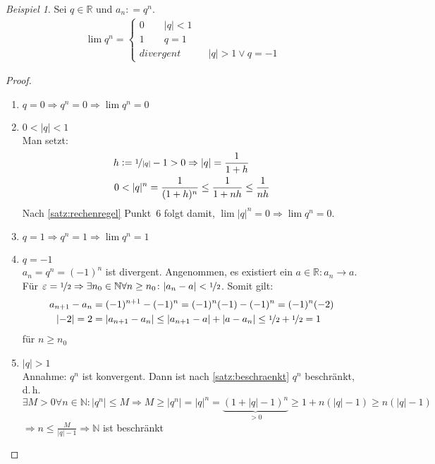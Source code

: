 \documentclass[ngerman,titlepage,twoside, parskip=half*]{scrreprt}
\newcommand*{\N}{\mathbb{N}}
\newcommand*{\R}{\mathbb{R}}
\theoremstyle{plain}
\theoremstyle{definition}
\theoremstyle{remark}
\newtheorem*{beispiel}{Beispiel}
\newcommand*{\abs}[2][]{#1\lvert#2#1\rvert}
\newcommand*{\coloneqq}{\mathrel{\mathop:}=}
\begin{document}
\begin{beispiel}
  Sei $q \in \R$ und $a_n \coloneqq q^n$.
  \begin{gather*}\lim q^n =
  \begin{cases}
    0 \qquad \abs{q} < 1\\
    1 \qquad q = 1\\
    divergent \qquad & \abs{q}>1 \vee q=-1
  \end{cases}\end{gather*}
\begin{proof}
  \begin{enumerate}[1.~F{a}ll]
  \item $q=0 \Rightarrow q^n=0 \Rightarrow \lim q^n=0$
  \item $0<\abs{q}<1$\\
    Man setzt:
    \begin{align*}
      h &\coloneqq \nicefrac{1}{\abs{q}}-1>0\Rightarrow \abs{q} =
      \frac{1}{1+h}\\
      0 &<\abs{q}^n = \frac{1}{(1+h)^n} \leq \frac{1}{1+nh} \leq
      \frac{1}{nh}
    \end{align*}
    Nach \autoref{satz:rechenregel} Punkt~6 folgt damit, $\lim \abs{q}^n=0
    \Rightarrow \lim q^n=0$.
  \item $q=1 \Rightarrow q^n =1 \Rightarrow \lim q^n=1$
  \item $q=-1$\\
    $a_n=q^n=(-1)^n$ ist divergent. Angenommen, es existiert ein $a
    \in \R \colon a_n \rightarrow a$. Für $\varepsilon=\nicefrac{1}{2}
    \Rightarrow \exists n_0 \in \N \forall n \geq n_0 \colon
    \abs{a_n-a}<\nicefrac{1}{2}$. Somit gilt:
    \begin{align*}
      a_{n+1}-a_n& = (-1)^{n+1}-(-1)^n = (-1)^n(-1)-(-1)^n =
      (-1)^n(-2)\\ \
      \abs{-2}=2 &= \abs{a_{n+1}-a_n} \leq \abs{a_{n+1}-a} + \abs{a-a_n} \leq
      \nicefrac{1}{2} +\nicefrac{1}{2}=1
    \end{align*}
    für $n \geq n_0$ \lightning
  \item $\abs{q}>1$\\
    Annahme: $q^n$ ist konvergent. Dann ist nach
    \autoref{satz:beschraenkt} $q^n$ beschränkt, d.\,h. $\exists M >
    0 \forall n \in \N \colon \abs{q^n} \leq M \Rightarrow M \geq
    \abs{q^n} = \abs{q}^n
    =\underbrace{(1+\abs{q}-1)^n}_{>0} \geq 1+n(\abs{q}-1) \geq n(\abs{q}-1)$\\
    $\Rightarrow n \leq \frac{M}{\abs{q}-1} \Rightarrow \N$ ist beschränkt
    \lightning
\end{enumerate}
\end{proof}
\end{beispiel}
\end{document}
